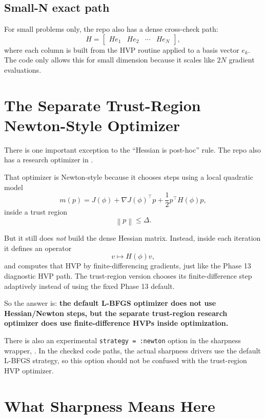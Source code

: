 \documentclass[11pt,letterpaper]{article}
\newcommand{\norm}[1]{\left\lVert #1 \right\rVert}
\begin{document}
\subsection{Small-N exact path}

For small problems only, the repo also has a dense cross-check path:
\[
H = \begin{bmatrix}
He_1 & He_2 & \cdots & He_N
\end{bmatrix},
\]
where each column is built from the HVP routine applied to a basis vector
$e_k$. The code only allows this for small dimension because it scales like
$2N$ gradient evaluations.

\section{The Separate Trust-Region Newton-Style Optimizer}

There is one important exception to the ``Hessian is post-hoc'' rule. The repo
also has a research optimizer in
.

That optimizer is Newton-style because it chooses steps using a local quadratic
model
\[
m(p) = J(\phi) + \nabla J(\phi)^\top p + \frac{1}{2}p^\top H(\phi)p,
\]
inside a trust region
\[
\norm{p} \leq \Delta.
\]

But it still does \emph{not} build the dense Hessian matrix. Instead, inside
each iteration it defines an operator
\[
v \mapsto H(\phi)v,
\]
and computes that HVP by finite-differencing gradients, just like the Phase 13
diagnostic HVP path. The trust-region version chooses its finite-difference
step adaptively instead of using the fixed Phase 13 default.

\begin{takeaway}
So the answer is:
\textbf{the default L-BFGS optimizer does not use Hessian/Newton steps, but the
separate trust-region research optimizer does use finite-difference HVPs inside
optimization.}
\end{takeaway}

There is also an experimental \texttt{strategy = :newton} option in the
sharpness wrapper, . In the checked
code paths, the actual sharpness drivers use the default L-BFGS strategy, so
this option should not be confused with the trust-region HVP optimizer.

\section{What Sharpness Means Here}
\end{document}
